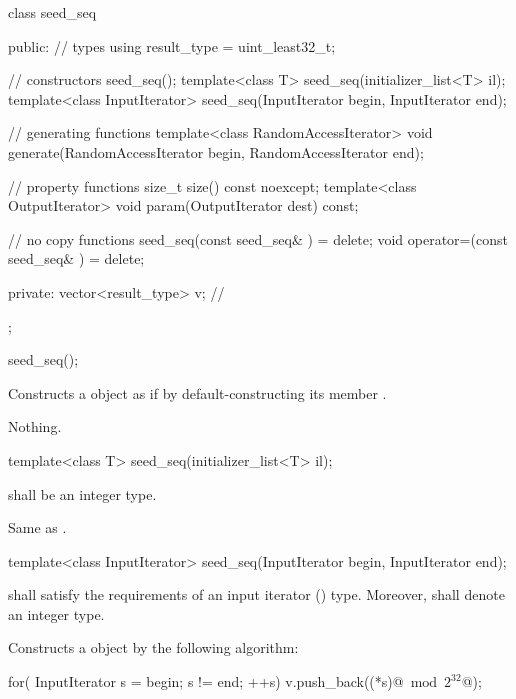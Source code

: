 %
\begin{codeblock}
class seed_seq {
public:
  // types
  using result_type = uint_least32_t;

  // constructors
  seed_seq();
  template<class T>
    seed_seq(initializer_list<T> il);
  template<class InputIterator>
    seed_seq(InputIterator begin, InputIterator end);

  // generating functions
  template<class RandomAccessIterator>
    void generate(RandomAccessIterator begin, RandomAccessIterator end);

  // property functions
  size_t size() const noexcept;
  template<class OutputIterator>
    void param(OutputIterator dest) const;

  // no copy functions
  seed_seq(const seed_seq& ) = delete;
  void operator=(const seed_seq& ) = delete;

private:
  vector<result_type> v;   // \expos
};
\end{codeblock}%


%
\begin{itemdecl}
seed_seq();
\end{itemdecl}

\begin{itemdescr}
\pnum\effects Constructs a  object
 as if by default-constructing its member .

\pnum
\throws Nothing.
\end{itemdescr}


%
\begin{itemdecl}
template<class T>
 seed_seq(initializer_list<T> il);
\end{itemdecl}

\begin{itemdescr}
\pnum\requires {} shall be an integer type.

\pnum\effects
 Same as .
\end{itemdescr}


%
\begin{itemdecl}
template<class InputIterator>
  seed_seq(InputIterator begin, InputIterator end);
\end{itemdecl}

\begin{itemdescr}
\pnum\requires
   shall satisfy the requirements
  of an input iterator () type.
  Moreover,
  shall denote an integer type.

\pnum\effects Constructs a  object
 by the following algorithm:
\begin{codeblock}
for( InputIterator s = begin; s != end; ++s)
 v.push_back((*s)@$\bmod 2^{32}$@);
\end{codeblock}%
\end{itemdescr}

